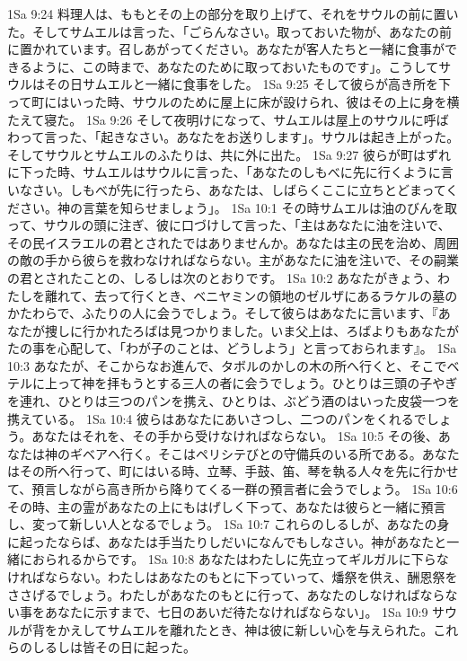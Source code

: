 1Sa 9:24  料理人は、ももとその上の部分を取り上げて、それをサウルの前に置いた。そしてサムエルは言った、「ごらんなさい。取っておいた物が、あなたの前に置かれています。召しあがってください。あなたが客人たちと一緒に食事ができるように、この時まで、あなたのために取っておいたものです」。こうしてサウルはその日サムエルと一緒に食事をした。
1Sa 9:25  そして彼らが高き所を下って町にはいった時、サウルのために屋上に床が設けられ、彼はその上に身を横たえて寝た。
1Sa 9:26  そして夜明けになって、サムエルは屋上のサウルに呼ばわって言った、「起きなさい。あなたをお送りします」。サウルは起き上がった。そしてサウルとサムエルのふたりは、共に外に出た。
1Sa 9:27  彼らが町はずれに下った時、サムエルはサウルに言った、「あなたのしもべに先に行くように言いなさい。しもべが先に行ったら、あなたは、しばらくここに立ちとどまってください。神の言葉を知らせましょう」。
1Sa 10:1  その時サムエルは油のびんを取って、サウルの頭に注ぎ、彼に口づけして言った、「主はあなたに油を注いで、その民イスラエルの君とされたではありませんか。あなたは主の民を治め、周囲の敵の手から彼らを救わなければならない。主があなたに油を注いで、その嗣業の君とされたことの、しるしは次のとおりです。
1Sa 10:2  あなたがきょう、わたしを離れて、去って行くとき、ベニヤミンの領地のゼルザにあるラケルの墓のかたわらで、ふたりの人に会うでしょう。そして彼らはあなたに言います、『あなたが捜しに行かれたろばは見つかりました。いま父上は、ろばよりもあなたがたの事を心配して、「わが子のことは、どうしよう」と言っておられます』。
1Sa 10:3  あなたが、そこからなお進んで、タボルのかしの木の所へ行くと、そこでベテルに上って神を拝もうとする三人の者に会うでしょう。ひとりは三頭の子やぎを連れ、ひとりは三つのパンを携え、ひとりは、ぶどう酒のはいった皮袋一つを携えている。
1Sa 10:4  彼らはあなたにあいさつし、二つのパンをくれるでしょう。あなたはそれを、その手から受けなければならない。
1Sa 10:5  その後、あなたは神のギベアへ行く。そこはペリシテびとの守備兵のいる所である。あなたはその所へ行って、町にはいる時、立琴、手鼓、笛、琴を執る人々を先に行かせて、預言しながら高き所から降りてくる一群の預言者に会うでしょう。
1Sa 10:6  その時、主の霊があなたの上にもはげしく下って、あなたは彼らと一緒に預言し、変って新しい人となるでしょう。
1Sa 10:7  これらのしるしが、あなたの身に起ったならば、あなたは手当たりしだいになんでもしなさい。神があなたと一緒におられるからです。
1Sa 10:8  あなたはわたしに先立ってギルガルに下らなければならない。わたしはあなたのもとに下っていって、燔祭を供え、酬恩祭をささげるでしょう。わたしがあなたのもとに行って、あなたのしなければならない事をあなたに示すまで、七日のあいだ待たなければならない」。
1Sa 10:9  サウルが背をかえしてサムエルを離れたとき、神は彼に新しい心を与えられた。これらのしるしは皆その日に起った。
